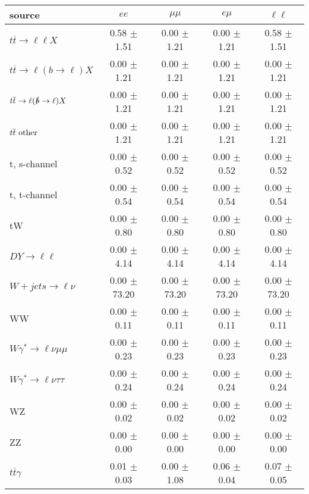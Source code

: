 \begin{tabular}{l|cccc} \hline\hline
source & $ee$ & $\mu\mu$ & $e\mu$ & $\ell\ell $ \\
\hline
$t\overline{t} \rightarrow \ell \ell X$ &  0.58 $\pm$  1.51 &  0.00 $\pm$  1.21 &  0.00 $\pm$  1.21 &  0.58 $\pm$  1.51 \\
$t\overline{t} \rightarrow \ell (b \rightarrow \ell) X$ &  0.00 $\pm$  1.21 &  0.00 $\pm$  1.21 &  0.00 $\pm$  1.21 &  0.00 $\pm$  1.21 \\
$t\overline{t} \rightarrow \ell (\slashed b \rightarrow \ell) X$ &  0.00 $\pm$  1.21 &  0.00 $\pm$  1.21 &  0.00 $\pm$  1.21 &  0.00 $\pm$  1.21 \\
        $t\overline{t}\ \rm{other}$ &  0.00 $\pm$  1.21 &  0.00 $\pm$  1.21 &  0.00 $\pm$  1.21 &  0.00 $\pm$  1.21 \\
\hline
                       t, s-channel &  0.00 $\pm$  0.52 &  0.00 $\pm$  0.52 &  0.00 $\pm$  0.52 &  0.00 $\pm$  0.52 \\
                       t, t-channel &  0.00 $\pm$  0.54 &  0.00 $\pm$  0.54 &  0.00 $\pm$  0.54 &  0.00 $\pm$  0.54 \\
                                 tW &  0.00 $\pm$  0.80 &  0.00 $\pm$  0.80 &  0.00 $\pm$  0.80 &  0.00 $\pm$  0.80 \\
\hline
         $DY \rightarrow \ell \ell$ &  0.00 $\pm$  4.14 &  0.00 $\pm$  4.14 &  0.00 $\pm$  4.14 &  0.00 $\pm$  4.14 \\
      $W+jets \rightarrow \ell \nu$ &  0.00 $\pm$ 73.20 &  0.00 $\pm$ 73.20 &  0.00 $\pm$ 73.20 &  0.00 $\pm$ 73.20 \\
                                 WW &  0.00 $\pm$  0.11 &  0.00 $\pm$  0.11 &  0.00 $\pm$  0.11 &  0.00 $\pm$  0.11 \\
\hline
$W\gamma^{*} \rightarrow \ell \nu \mu\mu$ &  0.00 $\pm$  0.23 &  0.00 $\pm$  0.23 &  0.00 $\pm$  0.23 &  0.00 $\pm$  0.23 \\
$W\gamma^{*} \rightarrow \ell \nu \tau\tau$ &  0.00 $\pm$  0.24 &  0.00 $\pm$  0.24 &  0.00 $\pm$  0.24 &  0.00 $\pm$  0.24 \\
                                 WZ &  0.00 $\pm$  0.02 &  0.00 $\pm$  0.02 &  0.00 $\pm$  0.02 &  0.00 $\pm$  0.02 \\
                                 ZZ &  0.00 $\pm$  0.00 &  0.00 $\pm$  0.00 &  0.00 $\pm$  0.00 &  0.00 $\pm$  0.00 \\
\hline
              $t\overline{t}\gamma$ &  0.01 $\pm$  0.03 &  0.00 $\pm$  1.08 &  0.06 $\pm$  0.04 &  0.07 $\pm$  0.05 \\

\end{tabular}
